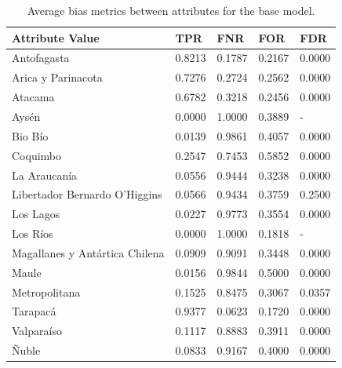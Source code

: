 \documentclass[twoside,11pt]{article}
\begin{document}
\begin{table}[ht]
\centering
\begin{tabular}{|p{3.5cm}|p{1cm}|p{1cm}|p{1cm}|p{1cm}|}
\hline

               \textbf{Attribute Value} &    \textbf{TPR} &    \textbf{FNR} &    \textbf{FOR} &    \textbf{FDR} \\ \hline

                   Antofagasta & 0.8213 & 0.1787 & 0.2167 & 0.0000 \\
            Arica y Parinacota & 0.7276 & 0.2724 & 0.2562 & 0.0000 \\
                       Atacama & 0.6782 & 0.3218 & 0.2456 & 0.0000 \\
                         Aysén & 0.0000 & 1.0000 & 0.3889 &    - \\
                       Bio Bío & 0.0139 & 0.9861 & 0.4057 & 0.0000 \\
                      Coquimbo & 0.2547 & 0.7453 & 0.5852 & 0.0000 \\
                  La Araucanía & 0.0556 & 0.9444 & 0.3238 & 0.0000 \\
 Libertador Bernardo O'Higgins & 0.0566 & 0.9434 & 0.3759 & 0.2500 \\
                     Los Lagos & 0.0227 & 0.9773 & 0.3554 & 0.0000 \\
                      Los Ríos & 0.0000 & 1.0000 & 0.1818 &    - \\
Magallanes y Antártica Chilena & 0.0909 & 0.9091 & 0.3448 & 0.0000 \\
                         Maule & 0.0156 & 0.9844 & 0.5000 & 0.0000 \\
                 Metropolitana & 0.1525 & 0.8475 & 0.3067 & 0.0357 \\
                      Tarapacá & 0.9377 & 0.0623 & 0.1720 & 0.0000 \\
                    Valparaíso & 0.1117 & 0.8883 & 0.3911 & 0.0000 \\
                         Ñuble & 0.0833 & 0.9167 & 0.4000 & 0.0000 \\

\hline
\end{tabular}
\caption{Average bias metrics between attributes for the base model.}
\label{tab_region_tdrogas_base:}
\end{table}
\end{document}
